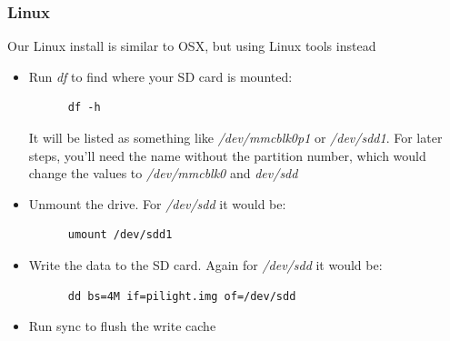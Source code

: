 \subsubsection{Linux}
Our Linux install is similar to OSX, but using Linux tools instead
\begin{itemize}
   \item Run \textit{df} to find where your SD card is mounted:
      \begin{lstlisting}
      df -h
      \end{lstlisting}
      It will be listed as something like \textit{/dev/mmcblk0p1} or \textit{/dev/sdd1}. For later steps, you'll need the name without the partition number, which would change the values to \textit{/dev/mmcblk0} and \textit{dev/sdd}
   \item Unmount the drive. For \textit{/dev/sdd} it would be:
      \begin{lstlisting}
      umount /dev/sdd1
      \end{lstlisting}
   \item Write the data to the SD card. Again for \textit{/dev/sdd} it would be:
      \begin{lstlisting}
      dd bs=4M if=pilight.img of=/dev/sdd
      \end{lstlisting}
   \item Run sync to flush the write cache
      \begin{lstlisting}
      \end{lstlisting}
\end{itemize}
